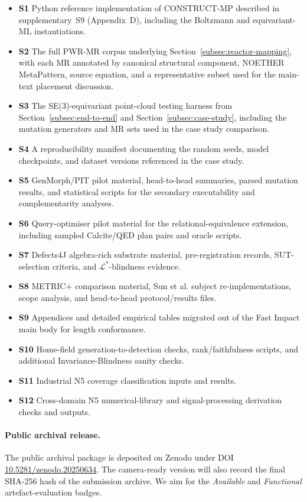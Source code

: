 \documentclass[acmsmall,screen,anonymous,review]{acmart}
\begin{document}
\begin{itemize}
    \item \textbf{S1} Python reference implementation of CONSTRUCT-MP described in supplementary~S9 (Appendix~D), including the Boltzmann and equivariant-ML instantiations.
    \item \textbf{S2} The full PWR-MR corpus underlying Section~\ref{subsec:reactor-mapping}, with each MR annotated by canonical structural component, NOETHER MetaPattern, source equation, and a representative subset used for the main-text placement discussion.
    \item \textbf{S3} The SE(3)-equivariant point-cloud testing harness from Section~\ref{subsec:end-to-end} and Section~\ref{subsec:case-study}, including the mutation generators and MR sets used in the case study comparison.
    \item \textbf{S4} A reproducibility manifest documenting the random seeds, model checkpoints, and dataset versions referenced in the case study.
    \item \textbf{S5} GenMorph/PIT pilot material, head-to-head summaries, parsed mutation results, and statistical scripts for the secondary executability and complementarity analyses.
    \item \textbf{S6} Query-optimiser pilot material for the relational-equivalence extension, including sampled Calcite/QED plan pairs and oracle scripts.
    \item \textbf{S7} Defects4J algebra-rich substrate material, pre-registration records, SUT-selection criteria, and $\mathcal{L}^{*}$-blindness evidence.
    \item \textbf{S8} METRIC+ comparison material, Sun et al. subject re-implementations, scope analysis, and head-to-head protocol/results files.
    \item \textbf{S9} Appendices and detailed empirical tables migrated out of the Fast Impact main body for length conformance.
    \item \textbf{S10} Home-field generation-to-detection checks, rank/faithfulness scripts, and additional Invariance-Blindness sanity checks.
    \item \textbf{S11} Industrial N5 coverage classification inputs and results.
    \item \textbf{S12} Cross-domain N5 numerical-library and signal-processing derivation checks and outputs.
\end{itemize}

\paragraph{Public archival release.} The public archival package is deposited
on Zenodo under DOI
\href{https://doi.org/10.5281/zenodo.20250634}{10.5281/zenodo.20250634}. The
camera-ready version will also record the final SHA-256 hash of the
submission archive. We aim for the \emph{Available} and \emph{Functional}
artefact-evaluation badges.
\end{document}
